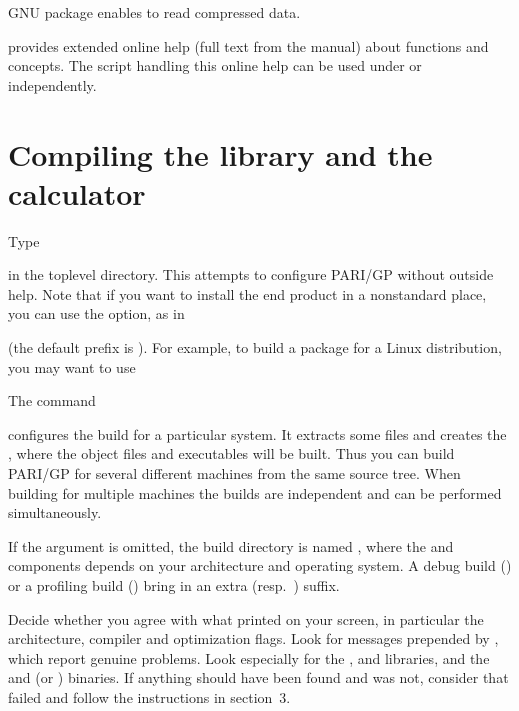   \item GNU  package enables  to read
compressed data.

  \item {} provides extended online help (full text from the
manual) about functions and concepts. The script handling this online help
can be used under  or independently.

\section{Compiling the library and the  calculator}

 Type


\noindent in the toplevel directory. This attempts to configure PARI/GP
without outside help. Note that if you want to install the end product in
a nonstandard place, you can use the  option, as in


\noindent (the default prefix is ). For example, to build a
package for a Linux distribution, you may want to use


The command


\noindent configures the build for a particular system. It extracts some files
and creates the  , where the object files and
executables will be built. Thus you can build PARI/GP for several different
machines from the same source tree. When building for multiple machines the
builds are independent and can be performed simultaneously.

If the  argument is omitted, the build directory is
named , where the  and
 components depends on your architecture and operating system.
A debug build () or a profiling build ()
bring in an extra  (resp.~) suffix.

Decide whether you agree with what  printed on your screen, in
particular the architecture, compiler and optimization flags. Look for
messages prepended by \kbd{\#\#\#}, which report genuine problems.
Look especially for the ,  and  libraries,
and the  and  (or ) binaries.
If anything should have been found and was not, consider that 
failed and follow the instructions in section~3.

